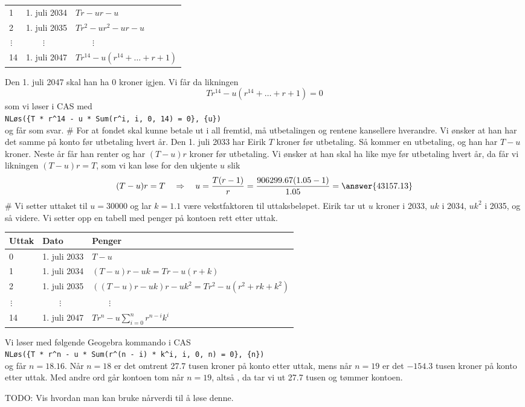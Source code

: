 \begin{easylist}[enumerate]
\begin{center}
\begin{tabular}{lll}
			1 & 1. juli 2034 & $Tr - ur - u$ \\
			2 & 1. juli 2035 & $Tr^2 -ur^2 - ur - u$ \\
			$\, \vdots$ & $\qquad \vdots$ & $\qquad \vdots$ \\
			14 & 1. juli 2047 & $Tr^{14} - u \left(r^{14} + \dots + r + 1\right)$  
		\end{tabular}
	\end{center}
	 Den 1. juli 2047 skal han ha $0$ kroner igjen. Vi får da likningen 
	 \begin{equation*}
	 	Tr^{14} - u \left(r^{14} + \dots + r + 1\right) = 0
	 \end{equation*}
	 som vi løser i CAS med \\
	 \verb|NLøs({T * r^14 - u * Sum(r^i, i, 0, 14) = 0}, {u})| \\
	 og får  som svar.
	# For at fondet skal kunne betale ut i all fremtid, må utbetalingen og rentene kansellere hverandre.
	Vi ønsker at han har det samme på konto før utbetaling hvert år.
	Den 1. juli 2033 har Eirik $T$ kroner før utbetaling. 
	Så kommer en utbetaling, og han har $T - u$ kroner.
	Neste år får han renter og har $(T-u)r$ kroner før utbetaling.
	Vi ønsker at han skal ha like mye før utbetaling hvert år, da får vi likningen $(T - u)r = T$, som vi kan løse for den ukjente $u$ slik
	\begin{equation*}
		(T - u)r = T \quad \Rightarrow \quad u = \frac{T(r-1)}{r}
		 = \frac{906299.67(1.05-1)}{1.05} = \answer{43157.13}
	\end{equation*}
	# Vi setter uttaket til $u = 30000$ og lar $k = 1.1$ være vekstfaktoren til uttaksbeløpet.
	Eirik tar ut $u$ kroner i 2033, $uk$ i 2034, $uk^2$ i 2035, og så videre.
	Vi setter opp en tabell med penger på kontoen rett etter uttak.
	\begin{center}
	\begin{tabular}{lll}
		\textbf{Uttak} & \textbf{Dato} & \textbf{Penger} \\ \hline
		0 & 1. juli 2033 & $T - u$ \\
		1 & 1. juli 2034 & $(T-u)r - uk = Tr - u(r + k)$ \\
		2 & 1. juli 2035 & $((T-u)r - uk)r - uk^2 = Tr^2 - u(r^2 +rk + k^2)$ \\
		$\, \vdots$ & $\qquad \vdots$ & $\qquad \vdots$ \\
		14 & 1. juli 2047 & $Tr^n - u \sum_{i=0}^{n} r^{n-i} k^i$  
	\end{tabular}
	\end{center}
	Vi løser med følgende Geogebra kommando i CAS \\
	\verb|NLøs({T * r^n - u * Sum(r^(n - i) * k^i, i, 0, n) = 0}, {n})| \\
	og får $n = 18.16$.
	Når $n = 18$ er det omtrent 27.7 tusen kroner på konto etter uttak, mens når $n = 19$ er det $-154.3$ tusen kroner på konto etter uttak.
	Med andre ord går kontoen tom når $n=19$, altså , da tar vi ut 27.7 tusen og tømmer kontoen.
	
	TODO: Vis hvordan man kan bruke nårverdi til å løse denne. 
\end{easylist}

